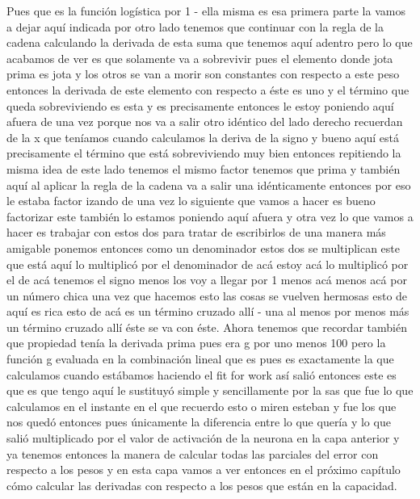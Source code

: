 Pues que es la función logística por 1 - ella misma es esa primera parte la vamos a dejar aquí indicada por otro lado tenemos que continuar con la regla de la cadena calculando la derivada de esta suma que tenemos aquí adentro pero lo que acabamos de ver es que solamente va a sobrevivir pues el elemento donde jota prima es jota y los otros se van a morir son constantes con respecto a este peso entonces la derivada de este elemento con respecto a éste es uno y el término que queda sobreviviendo es esta y es precisamente entonces le estoy poniendo aquí afuera de una vez porque nos va a salir otro idéntico del lado derecho recuerdan de la x que teníamos cuando calculamos la deriva de la signo y bueno aquí está precisamente el término que está sobreviviendo muy bien entonces repitiendo la misma idea de este lado tenemos el mismo factor tenemos que prima y también aquí al aplicar la regla de la cadena va a salir una idénticamente entonces por eso le estaba factor izando de una vez lo siguiente que vamos a hacer es bueno factorizar este también lo estamos poniendo aquí afuera y otra vez lo que vamos a hacer es trabajar con estos dos para tratar de escribirlos de una manera más amigable ponemos entonces como un denominador estos dos se multiplican este que está aquí lo multiplicó por el denominador de acá estoy acá lo multiplicó por el de acá tenemos el signo menos los voy a llegar por 1 menos acá menos acá por un número chica una vez que hacemos esto las cosas se vuelven hermosas esto de aquí es rica esto de acá es un término cruzado allí - una al menos por menos más un término cruzado allí éste se va con éste. 
Ahora tenemos que recordar también que propiedad  tenía la derivada prima pues era g por uno menos 100 pero la función g evaluada en la combinación lineal que es pues es exactamente la que calculamos cuando estábamos haciendo el fit for work así salió entonces este es que es que tengo aquí le sustituyó simple y sencillamente por la sas que fue lo que calculamos en el instante en el que recuerdo esto o miren esteban y fue los que nos quedó entonces pues únicamente la diferencia entre lo que quería y lo que salió multiplicado por el valor de activación de la neurona en la capa anterior y ya tenemos entonces la manera de calcular todas las parciales del error con respecto a los pesos y en esta capa vamos a ver entonces en el próximo capítulo cómo calcular las derivadas con respecto a los pesos que están en la capacidad.
